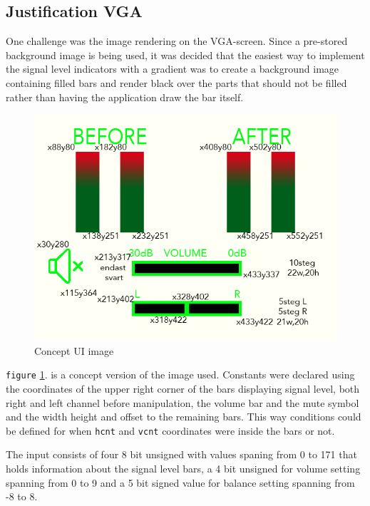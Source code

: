 \subsection{Justification VGA}

One challenge was the image rendering on the VGA-screen. Since a
pre-stored background image is being used, it was decided that the
easiest way to implement the signal level indicators with a gradient
was to create a background image containing filled bars and render
black over the parts that should not be filled rather than having the
application draw the bar itself.

\begin{figure}[H]
        \centering 
        \includegraphics[scale=1.00]{fig/picture_xy.png}
        \caption{Concept UI image}
        \label{fig:picture_xy}
\end{figure}

\verb+figure+ \ref{fig:picture_xy}. is a concept version of the image
used. Constants were declared using the coordinates of the upper right
corner of the bars displaying signal level, both right and left
channel before manipulation, the volume bar and the mute symbol and
the width height and offset to the remaining bars. This way conditions
could be defined for when \verb+hcnt+ and \verb+vcnt+ coordinates were
inside the bars or not.

The input consists of four 8 bit unsigned with values spaning from 0
to 171 that holds information about the signal level bars, a 4 bit
unsigned for volume setting spanning from 0 to 9 and a 5 bit signed
value for balance setting spanning from -8 to 8.

